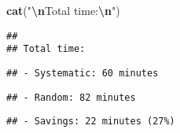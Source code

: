 \documentclass[
]{article}
\newenvironment{Shaded}{\begin{snugshade}}{\end{snugshade}}
\newcommand{\FunctionTok}[1]{\textcolor[rgb]{0.13,0.29,0.53}{\textbf{#1}}}
\newcommand{\NormalTok}[1]{#1}
\newcommand{\SpecialCharTok}[1]{\textcolor[rgb]{0.81,0.36,0.00}{\textbf{#1}}}
\newcommand{\StringTok}[1]{\textcolor[rgb]{0.31,0.60,0.02}{#1}}
\begin{document}
\begin{Shaded}
\begin{Highlighting}[]
\FunctionTok{cat}\NormalTok{(}\StringTok{"}\SpecialCharTok{\textbackslash{}n}\StringTok{Total time:}\SpecialCharTok{\textbackslash{}n}\StringTok{"}\NormalTok{)}
\end{Highlighting}
\end{Shaded}

\begin{verbatim}
## 
## Total time:
\end{verbatim}

\begin{Shaded}
\end{Shaded}

\begin{verbatim}
## - Systematic: 60 minutes
\end{verbatim}

\begin{Shaded}
\end{Shaded}

\begin{verbatim}
## - Random: 82 minutes
\end{verbatim}

\begin{Shaded}
\end{Shaded}

\begin{verbatim}
## - Savings: 22 minutes (27%)
\end{verbatim}
\end{document}
